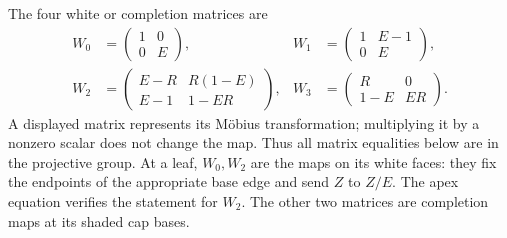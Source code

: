 The four white or completion matrices are
\begin{equation}\label{sm:W}
\begin{aligned}
 W_0&=\begin{pmatrix}1&0\\0&E\end{pmatrix},&
 W_1&=\begin{pmatrix}1&E-1\\0&E\end{pmatrix},\\
 W_2&=\begin{pmatrix}E-R&R(1-E)\\E-1&1-ER\end{pmatrix},&
 W_3&=\begin{pmatrix}R&0\\1-E&ER\end{pmatrix}.
\end{aligned}
\end{equation}
A displayed matrix represents its Möbius transformation; multiplying
it by a nonzero scalar does not change the map. Thus all matrix
equalities below are in the projective group. At a leaf, $W_0,W_2$ are the maps on its
white faces: they fix the endpoints of the appropriate base edge and
send $Z$ to $Z/E$. The apex equation verifies the statement for
$W_2$. The other two matrices are completion maps at its shaded
cap bases.

